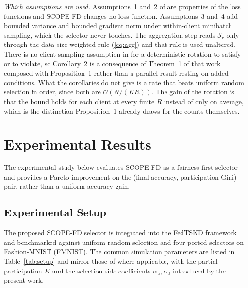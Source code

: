 \documentclass[journal]{IEEEtran}
\newcommand{\rev}[1]{{\color{blue}#1}}
\begin{document}
\rev{\textit{Which assumptions are used.} Assumptions~1 and~2 of \cite{mu2024fedtskd} are properties of the loss functions and SCOPE-FD changes no loss function. Assumptions~3 and~4 add bounded variance and bounded gradient norm under within-client minibatch sampling, which the selector never touches. The aggregation step reads $\mathcal{S}_r$ only through the data-size-weighted rule (\ref{eq:agg}) and that rule is used unaltered. There is no client-sampling assumption in \cite{mu2024fedtskd} for a deterministic rotation to satisfy or to violate, so Corollary~2 is a consequence of Theorem~1 of that work composed with Proposition~1 rather than a parallel result resting on added conditions. What the corollaries do not give is a rate that beats uniform random selection in order, since both are $\mathcal{O}(N/(KR))$. The gain of the rotation is that the bound holds for each client at every finite $R$ instead of only on average, which is the distinction Proposition~1 already draws for the counts themselves.}

\section{Experimental Results}
\label{sec:experiments}

The experimental study below evaluates SCOPE-FD as a fairness-first selector and provides a Pareto improvement on the (final accuracy, participation Gini) pair, rather than a uniform accuracy gain.

\subsection{Experimental Setup}
\label{ssec:exp-setup}

The proposed SCOPE-FD selector is integrated into the FedTSKD framework \cite{mu2024fedtskd} and benchmarked against uniform random selection and four ported selectors on Fashion-MNIST (FMNIST). The common simulation parameters are listed in Table~\ref{tab:setup} and mirror those of \cite{mu2024fedtskd} where applicable, with the partial-participation $K$ and the selection-side coefficients $\alpha_u, \alpha_d$ introduced by the present work.
\end{document}
